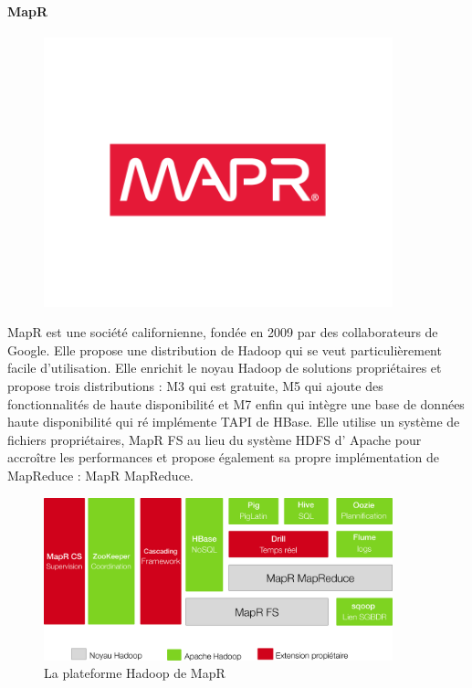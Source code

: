 \documentclass[12pt]{article}
\begin{document}
\paragraph{MapR}
\begin{figure}[H]
\centering
\includegraphics[width=0.9\textwidth]{MapR}
\end{figure}
MapR est une société californienne, fondée en 2009 par des collaborateurs de Google. Elle propose une distribution de Hadoop qui se veut particulièrement facile d'utilisation. Elle enrichit le noyau Hadoop de solutions propriétaires et propose trois distributions : M3 qui est gratuite, M5 qui ajoute des fonctionnalités de haute disponibilité et M7 enfin qui intègre une base de données haute disponibilité qui ré implémente TAPI de HBase. Elle utilise un système de fichiers propriétaires, MapR FS au lieu du système HDFS d’ Apache pour accroître les performances et propose également sa propre implémentation de MapReduce : MapR MapReduce.
\begin{figure}[H]
\centering
\includegraphics[width=0.9\textwidth]{Mp}
\caption{La plateforme Hadoop de MapR}
\end{figure}
\end{document}
